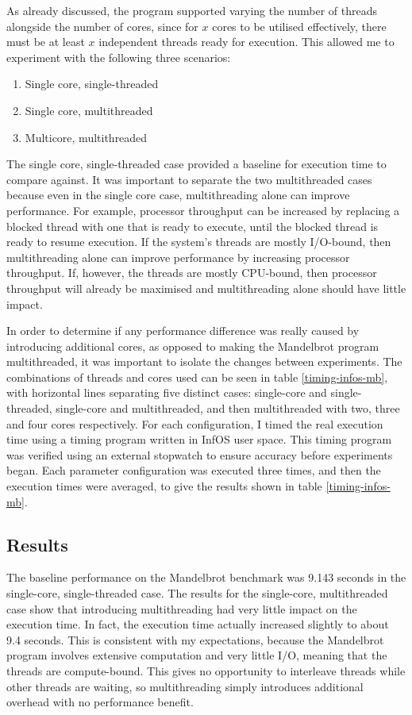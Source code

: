 \documentclass[bsc,frontabs,singlespacing,parskip,deptreport]{infthesis}
\begin{document}
As already discussed, the program supported varying the number of threads alongside the number of cores, since for $x$ cores to be utilised effectively, there must be at least $x$ independent threads ready for execution. This allowed me to experiment with the following three scenarios:

\begin{enumerate}
    \item Single core, single-threaded 
    \item Single core, multithreaded 
    \item Multicore, multithreaded
\end{enumerate}

The single core, single-threaded case provided a baseline for execution time to compare against. It was important to separate the two multithreaded cases because even in the single core case, multithreading alone can improve performance. For example, processor throughput can be increased by replacing a blocked thread with one that is ready to execute, until the blocked thread is ready to resume execution. If the system's threads are mostly I/O-bound, then multithreading alone can improve performance by increasing processor throughput. If, however, the threads are mostly CPU-bound, then processor throughput will already be maximised and multithreading alone should have little impact. 

In order to determine if any performance difference was really caused by introducing additional cores, as opposed to making the Mandelbrot program multithreaded, it was important to isolate the changes between experiments. The combinations of threads and cores used can be seen in table \ref{timing-infos-mb}, with horizontal lines separating five distinct cases: single-core and single-threaded, single-core and multithreaded, and then multithreaded with two, three and four cores respectively. For each configuration, I timed the real execution time using a timing program written in InfOS user space. This timing program was verified using an external stopwatch to ensure accuracy before experiments began. Each parameter configuration was executed three times, and then the execution times were averaged, to give the results shown in table \ref{timing-infos-mb}.

\subsection{Results} \label{mb-benchmark-results}
The baseline performance on the Mandelbrot benchmark was 9.143 seconds in the single-core, single-threaded case. The results for the single-core, multithreaded case show that introducing multithreading had very little impact on the execution time. In fact, the execution time actually increased slightly to about 9.4 seconds. This is consistent with my expectations, because the Mandelbrot program involves extensive computation and very little I/O, meaning that the threads are compute-bound. This gives no opportunity to interleave threads while other threads are waiting, so multithreading simply introduces additional overhead with no performance benefit. 
\end{document}
